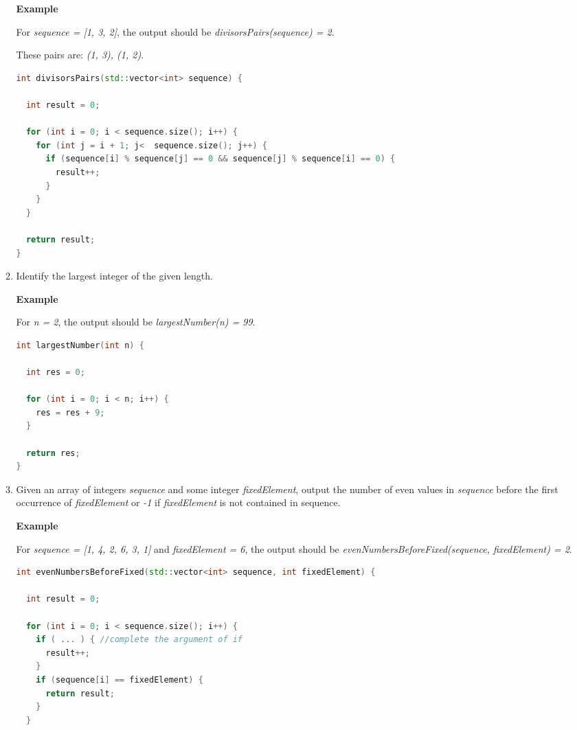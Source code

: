\begin{enumerate}
\begin{enumerate}
\textbf{Example}

For \textit{sequence = [1, 3, 2]}, the output should be
\textit{divisorsPairs(sequence) = 2}.

These pairs are: \textit{(1, 3), (1, 2)}.
	
	\begin{lstlisting}[language=C++, frame=single]
int divisorsPairs(std::vector<int> sequence) {

  int result = 0;

  for (int i = 0; i < sequence.size(); i++) {
    for (int j = i + 1; j<  sequence.size(); j++) {
      if (sequence[i] % sequence[j] == 0 && sequence[j] % sequence[i] == 0) {
        result++;
      }
    }
  }

  return result;
}

	\end{lstlisting}


	\item Identify the largest integer of the given length.

\textbf{Example}

For \textit{n = 2}, the output should be
\textit{largestNumber(n) = 99}.
	
	\begin{lstlisting}[language=C++, frame=single]
int largestNumber(int n) {

  int res = 0;

  for (int i = 0; i < n; i++) {
    res = res + 9;
  }

  return res;
}
	\end{lstlisting}

	\item Given an array of integers \textit{sequence} and some integer \textit{fixedElement}, output the number of even values in \textit{sequence} before the first occurrence of \textit{fixedElement} or \textit{-1} if \textit{fixedElement} is not contained in sequence.
	
\textbf{Example}

For \textit{sequence = [1, 4, 2, 6, 3, 1]} and \textit{fixedElement = 6}, the output should be
\textit{evenNumbersBeforeFixed(sequence, fixedElement) = 2}.
	
	\begin{lstlisting}[language=C++, frame=single]
int evenNumbersBeforeFixed(std::vector<int> sequence, int fixedElement) {

  int result = 0;

  for (int i = 0; i < sequence.size(); i++) {
    if ( ... ) { //complete the argument of if
      result++;
    }
    if (sequence[i] == fixedElement) {
      return result;
    }
  }


\end{lstlisting}
\end{enumerate}
\end{enumerate}
